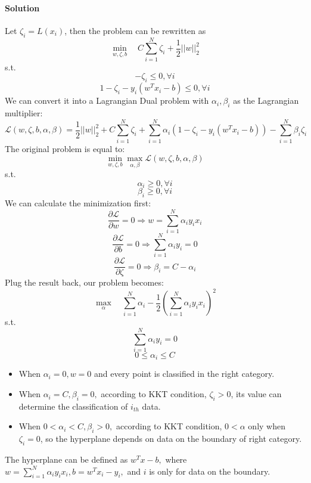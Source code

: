 \documentclass{article}
\begin{document}
\paragraph{Solution}
Let $\zeta_i=L(x_i)$, then the problem can be rewritten as 
$$\min_{w,\zeta,b}\quad C\sum_{i=1}^N\zeta_i+\frac{1}{2}||w||_2^2$$
s.t.
$$-\zeta_i\leq0,\forall i$$
$$1-\zeta_i-y_i(w^Tx_i-b)\leq0,\forall i$$
We can convert it into a Lagrangian Dual problem with $\alpha_i,\beta_i$ as the Lagrangian multiplier:
$$\mathcal{L}(w,\zeta,b,\alpha,\beta)=\frac{1}{2}||w||_2^2+C\sum_{i=1}^N\zeta_i+\sum_{i=1}^N\alpha_i(1-\zeta_i-y_i(w^Tx_i-b))-\sum_{i=1}^N\beta_i\zeta_i$$
The original problem is equal to: 
$$\min_{w,\zeta,b}\max_{\alpha,\beta}\mathcal{L}(w,\zeta,b,\alpha,\beta)$$
s.t. 
$$\alpha_i\geq0,\forall i$$
$$\beta_i\geq0,\forall i$$
We can calculate the minimization first:
$$\frac{\partial\mathcal{L}}{\partial w}=0\Rightarrow w=\sum_{i=1}^N\alpha_iy_ix_i$$
$$\frac{\partial\mathcal{L}}{\partial b}=0\Rightarrow \sum_{i=1}^N\alpha_iy_i=0$$
$$\frac{\partial\mathcal{L}}{\partial \zeta}=0\Rightarrow \beta_i=C-\alpha_i$$
Plug the result back, our problem becomes: 
    $$\max_\alpha\quad\sum_{i=1}^N\alpha_i-\frac{1}{2}(\sum_{i=1}^N\alpha_iy_ix_i)^2$$
s.t.
    $$\sum_{i=1}^N\alpha_iy_i=0$$
    $$0\leq\alpha_i\leq C$$
\begin{itemize}
    \item When $\alpha_i=0,w=0$ and every point is classified in the right category.
    \item When $\alpha_i=C,\beta_i=0,$ according to KKT condition, $\zeta_i>0$, its value can determine the classification of $i_{th}$ data.
    \item When $0<\alpha_i<C,\beta_i>0,$ according to KKT condition, $0<\alpha$ only when $\zeta_i=0$, so the hyperplane depends on data on the boundary of right category.
\end{itemize}
The hyperplane can be defined as $w^Tx-b,$ where $w=\sum_{i=1}^N\alpha_iy_ix_i,b=w^Tx_i-y_i,$ and $i$ is only for data on the boundary.
\end{document}

